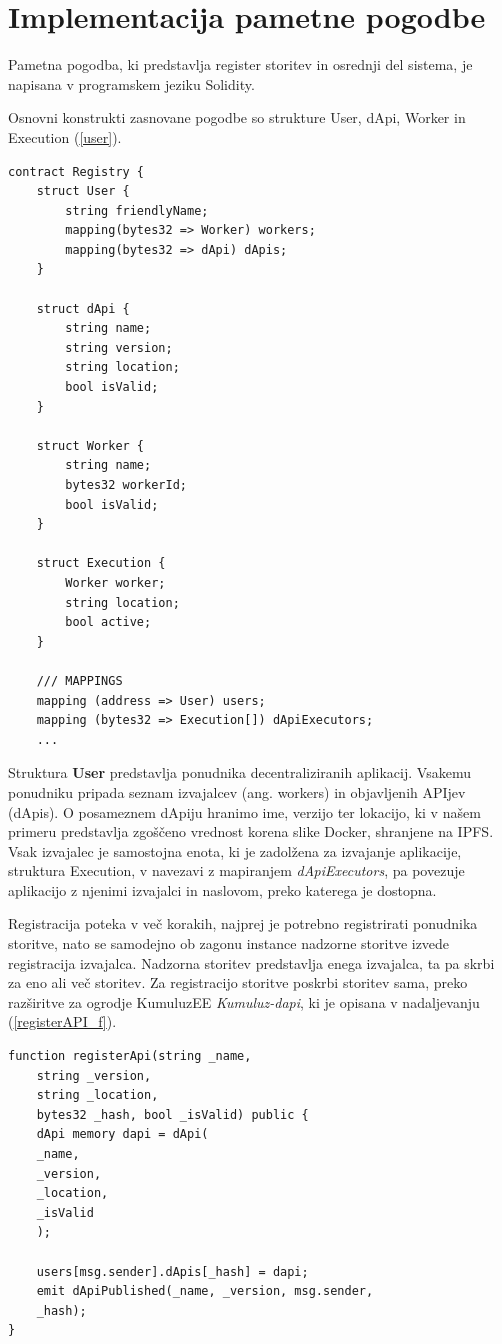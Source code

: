 \documentclass[a4paper, 12pt]{book}
\begin{document}
\section{Implementacija pametne pogodbe}
Pametna pogodba, ki predstavlja register storitev in osrednji del sistema, je napisana v programskem jeziku Solidity.

Osnovni konstrukti zasnovane pogodbe so strukture User, dApi, Worker in Execution (\ref{user}).

\begin{lstlisting}[caption={Osnovni konstrukti pametne pogodbe za decentraliziran register storitev},captionpos=b,label={user}]
contract Registry {
	struct User {
		string friendlyName;
		mapping(bytes32 => Worker) workers;
		mapping(bytes32 => dApi) dApis;
	}
	
	struct dApi {
		string name;
		string version;
		string location;
		bool isValid;
	}
	
	struct Worker {
		string name;
		bytes32 workerId;
		bool isValid;
	}
	
	struct Execution {
		Worker worker;
		string location;
		bool active;
	}
	
 	/// MAPPINGS
	mapping (address => User) users;
	mapping (bytes32 => Execution[]) dApiExecutors;
	...
\end{lstlisting}

Struktura \textbf{User} predstavlja ponudnika decentraliziranih aplikacij.
Vsakemu ponudniku pripada seznam izvajalcev (ang. workers) in objavljenih APIjev (dApis).
O posameznem dApiju hranimo ime, verzijo ter lokacijo, ki v našem primeru predstavlja zgoščeno vrednost korena slike Docker, shranjene na IPFS.
Vsak izvajalec je samostojna enota, ki je zadolžena za izvajanje aplikacije, struktura Execution, v navezavi z mapiranjem \textit{dApiExecutors}, pa povezuje aplikacijo z njenimi izvajalci in naslovom, preko katerega je dostopna.

Registracija poteka v več korakih, najprej je potrebno registrirati ponudnika storitve, nato se samodejno ob zagonu instance nadzorne storitve izvede registracija izvajalca.
Nadzorna storitev predstavlja enega izvajalca, ta pa skrbi za eno ali več storitev.
Za registracijo storitve poskrbi storitev sama, preko razširitve za ogrodje KumuluzEE \textit{Kumuluz-dapi}, ki je opisana v nadaljevanju (\ref{registerAPI_f}).

\begin{lstlisting}[caption={Funkcija za registracijo APIja},captionpos=b,label={registerAPI_f}]
function registerApi(string _name,
	string _version,
	string _location,
	bytes32 _hash, bool _isValid) public {
	dApi memory dapi = dApi(
	_name,
	_version,
	_location,
	_isValid
	);
	
	users[msg.sender].dApis[_hash] = dapi;
	emit dApiPublished(_name, _version, msg.sender,
	_hash);
}
\end{lstlisting}
\end{document}
